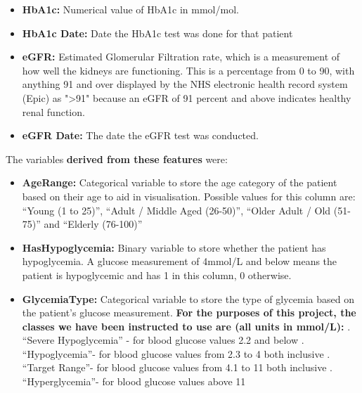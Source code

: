 {\begin{itemize}
        \item \textbf{HbA1c:} Numerical value of HbA1c in mmol/mol.
        \item \textbf{HbA1c Date:} Date the HbA1c test was done for that patient
        \item \textbf{eGFR:} Estimated Glomerular Filtration rate, which is a measurement of how well the kidneys are functioning. This is a percentage from 0 to 90, with anything 91 and over displayed by the NHS electronic health record system (Epic) as "\textgreater91" because an eGFR of 91 percent and above indicates healthy renal function.
        \item \textbf{eGFR Date:} The date the eGFR test was conducted. 
    \end{itemize}

    
    \vspace{10pt}
    The variables \textbf{derived from these features} were: 
    
    \begin{itemize}
        \item \textbf{Age\textunderscore Range:}  Categorical variable to store the age category of the patient based on their age to aid in visualisation. Possible values for this column are: ``Young (1 to 25)'', ``Adult / Middle Aged (26-50)'', ``Older Adult / Old (51-75)'' and ``Elderly (76-100)''

        \item \textbf{Has\textunderscore Hypoglycemia:} Binary variable to store whether the patient has hypoglycemia. A glucose measurement of 4mmol/L and below means the patient is hypoglycemic and has 1 in this column, 0 otherwise. 

        \item \textbf{Glycemia\textunderscore Type:} Categorical variable to store the type of glycemia based on the patient's glucose measurement. \textbf{For the purposes of this project, the classes we have been instructed to use are (all units in mmol/L):} . ``Severe Hypoglycemia'' - for blood glucose values 2.2 and below . ``Hypoglycemia''- for blood glucose values from 2.3 to 4 both inclusive . ``Target Range''- for blood glucose values from 4.1 to 11 both inclusive . ``Hyperglycemia''- for blood glucose values above 11 \newline


\end{itemize}}
